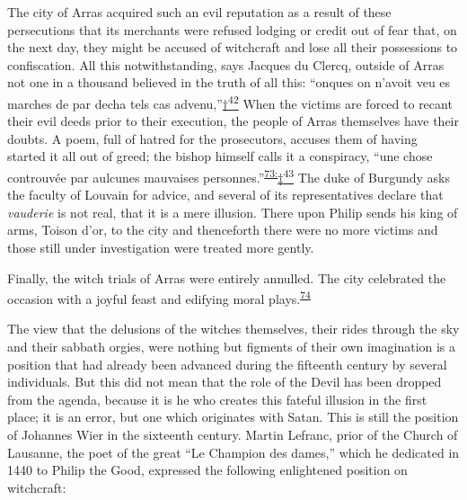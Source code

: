 The city of Arras acquired such an evil reputation as a result of these
persecutions that its merchants were refused lodging or credit out of
fear that, on the next day, they might be accused of witchcraft and lose
all their possessions to confiscation. All this notwithstanding, says
Jacques du Clercq, outside of Arras not one in a thousand believed in
the truth of all this: ``onques on n'avoit veu es marches de par decha
tels cas
advenu,''\protect\hypertarget{18_Chapter_Eleven__THE_FORMS_OF_THO.xhtmlux5cux23id_2645}{\protect\hyperlink{23_NOTES.xhtmlux5cux23id_2646}{†\textsuperscript{42}}}
When the victims are forced to recant their evil deeds prior to their
execution, the people of Arras themselves have their doubts. A poem,
full of hatred for the prosecutors, accuses them of having started it
all out of greed; the bishop himself calls it a conspiracy, ``une chose
controuvée par aulcunes mauvaises
personnes.''\textsuperscript{\protect\hypertarget{18_Chapter_Eleven__THE_FORMS_OF_THO.xhtmlux5cux23id_488}{\protect\hyperlink{23_NOTES.xhtmlux5cux23id_489}{73:}}}\protect\hypertarget{18_Chapter_Eleven__THE_FORMS_OF_THO.xhtmlux5cux23id_2647}{\protect\hyperlink{23_NOTES.xhtmlux5cux23id_2648}{‡\textsuperscript{43}}}
The duke of Burgundy asks the faculty of Louvain for advice, and several
of its representatives declare that \emph{vauderie} is not real, that it
is a mere illusion. There
\protect\hypertarget{18_Chapter_Eleven__THE_FORMS_OF_THO.xhtmlux5cux23page_290}{}{}upon
Philip sends his king of arms, Toison d'or, to the city and thenceforth
there were no more victims and those still under investigation were
treated more gently.

Finally, the witch trials of Arras were entirely annulled. The city
celebrated the occasion with a joyful feast and edifying moral
plays.\textsuperscript{\protect\hypertarget{18_Chapter_Eleven__THE_FORMS_OF_THO.xhtmlux5cux23id_486}{\protect\hyperlink{23_NOTES.xhtmlux5cux23id_487}{74}}}

The view that the delusions of the witches themselves, their rides
through the sky and their sabbath orgies, were nothing but figments of
their own imagination is a position that had already been advanced
during the fifteenth century by several individuals. But this did not
mean that the role of the Devil has been dropped from the agenda,
because it is he who creates this fateful illusion in the first place;
it is an error, but one which originates with Satan. This is still the
position of Johannes Wier in the sixteenth century. Martin Lefranc,
prior of the Church of Lausanne, the poet of the great ``Le Champion des
dames,'' which he dedicated in 1440 to Philip the Good, expressed the
following enlightened position on witchcraft:

